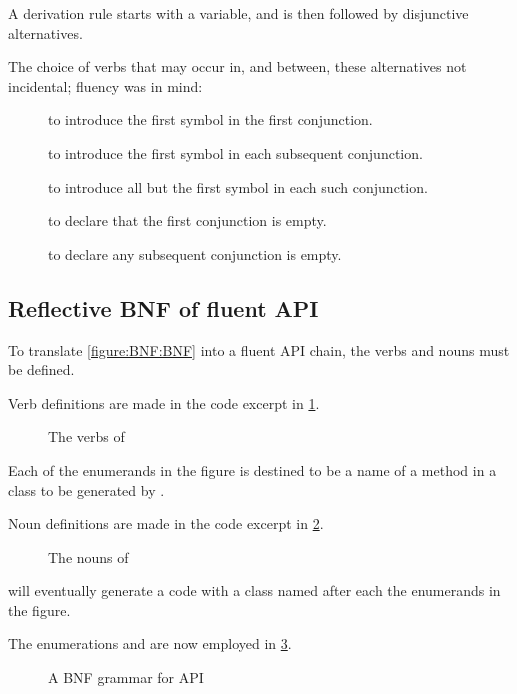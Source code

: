 A derivation rule starts with a variable, and is then followed by disjunctive alternatives.

The choice of verbs that may occur in, and between, these alternatives not incidental;
fluency was in mind:
\begin{description}
  \item[] to introduce the first symbol in the first conjunction.
  \item[] to introduce the first symbol in each subsequent conjunction.
  \item[] to introduce all but the first symbol in each such conjunction.
  \item[] to declare that the first conjunction is empty.
  \item[] to declare any subsequent conjunction is empty.
\end{description}

\subsection{Reflective BNF of fluent API}

To translate \cref{figure:BNF:BNF} into a fluent
API chain, the verbs and nouns must be defined.

Verb definitions are made in the code excerpt in
\cref{figure:Verbs}.

\begin{figure}[htb]
  \caption{The verbs of \Fajita}
  \label{figure:Verbs}
\end{figure}
Each of the enumerands in the figure is destined to be a
  name of a method in a class to be generated by \Fajita.

Noun definitions are made in the code excerpt in \cref{figure:Nouns}.

\begin{figure}[htb]
  \caption{The nouns of \Fajita}
  \label{figure:Nouns}
\end{figure}
  \Fajita will eventually generate a code with
  a class named after each the enumerands in the figure.

The enumerations  and 
  are now employed in \cref{figure:BNF:fluent}.

\begin{figure}[htb]
  \caption{A BNF grammar for \Fajita API}
  \label{figure:BNF:fluent}
\end{figure}

